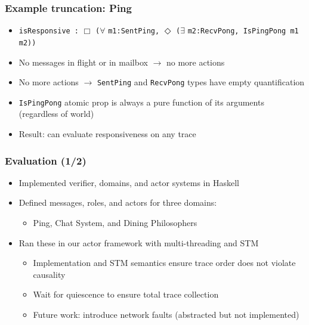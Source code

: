 \documentclass[12pt,aspectratio=169]{beamer}
\begin{document}
\begin{frame}
\frametitle{Example truncation: Ping}
\begin{itemize}
  \item \texttt{isResponsive :}
  \newline $\Box$ \texttt{(}$\forall$ \texttt{m1:SentPing,} $\Diamond$ \texttt{(}$\exists$ \texttt{m2:RecvPong, IsPingPong m1 m2))}
  \item No messages in flight or in mailbox $\rightarrow$ no more actions
  \item No more actions $\rightarrow$ \texttt{SentPing} and \texttt{RecvPong} types have empty quantification
  \item \texttt{IsPingPong} atomic prop is always a pure function of its arguments (regardless of world)
  \item Result: can evaluate responsiveness on any trace
\end{itemize}
\end{frame}

\begin{frame}
\frametitle{Evaluation (1/2)}
\begin{itemize}
  \item Implemented verifier, domains, and actor systems in Haskell
  \item Defined messages, roles, and actors for three domains:
  \begin{itemize}
    \item Ping, Chat System, and Dining Philosophers
  \end{itemize}
  \item Ran these in our actor framework with multi-threading and STM
  \begin{itemize}
    \item Implementation and STM semantics ensure trace order does not violate causality
    \item Wait for quiescence to ensure total trace collection
    \item Future work: introduce network faults (abstracted but not implemented)
  \end{itemize}
\end{itemize}
\end{frame}
\end{document}
